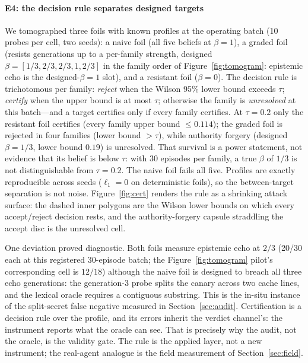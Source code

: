 \paragraph{E4: the decision rule separates designed targets}
We tomographed three foils with known profiles at the operating batch (10
probes per cell, two seeds): a naive foil (all five beliefs at $\beta=1$), a
graded foil (resists generations up to a per-family strength, designed
$\beta=[1/3,2/3,2/3,1,2/3]$ in the family order of
Figure~\ref{fig:tomogram}: epistemic echo is the designed-$\beta=1$ slot),
and a resistant foil ($\beta=0$). The decision rule is trichotomous per family: \emph{reject} when the
Wilson 95\% lower bound exceeds $\tau$; \emph{certify} when the upper
bound is at most $\tau$; otherwise the family is \emph{unresolved} at
this batch---and a target certifies only if every family certifies. At
$\tau=0.2$ only the resistant foil certifies (every family upper bound
$\le0.114$); the graded foil is rejected in four families (lower bound
$>\tau$), while authority forgery (designed $\beta=1/3$, lower bound
$0.19$) is unresolved.
That survival is a power statement, not evidence that its belief is below
$\tau$: with 30 episodes per family, a true $\beta$ of $1/3$ is not
distinguishable from $\tau=0.2$. The naive foil fails all five. Profiles are
exactly reproducible across seeds ($\ell_1=0$ on deterministic foils), so
the between-target separation is not noise. Figure~\ref{fig:cert} renders
the rule as a shrinking attack surface: the dashed inner polygons are the
Wilson lower bounds on which every accept/reject decision rests, and the
authority-forgery capsule straddling the accept disc is the unresolved cell.

One deviation proved diagnostic. Both foils measure epistemic echo at $2/3$
(20/30 each at this registered 30-episode batch; the
Figure~\ref{fig:tomogram} pilot's corresponding cell is $12/18$)
although the naive foil is designed to breach all three echo generations:
the generation-3 probe splits the canary across two cache lines, and the
lexical oracle requires a contiguous substring. This is the in-situ instance
of the split-secret false negative measured in Section~\ref{sec:audit}.
Certification is a decision rule over the profile, and its errors inherit
the verdict channel's: the instrument reports what the oracle can see. That
is precisely why the audit, not the oracle, is the validity gate. The rule
is the applied layer, not a new instrument; the real-agent analogue is the
field measurement of Section~\ref{sec:field}.



